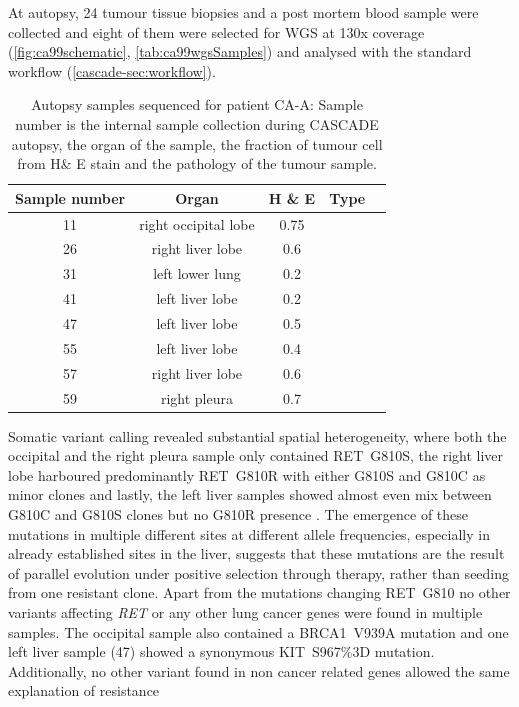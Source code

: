 At autopsy, 24 tumour tissue biopsies and a post mortem blood sample were collected and eight of them were selected for WGS at 130x coverage (\autoref{fig:ca99schematic}, \autoref{tab:ca99wgsSamples}) and analysed with the standard workflow (\autoref{cascade-sec:workflow}).

\begin{table}[ht]
\caption[Autopsy samples sequenced for patient CA-A]{Autopsy samples sequenced for patient CA-A: Sample number is the internal sample collection during CASCADE autopsy, the organ of the sample, the fraction of tumour cell from H\& E stain and the pathology of the tumour sample.}\label{tab:ca99wgsSamples}
\centering
{}
\begin{tabular}{|c|c|c|c|c|}
\toprule
\hline
 \rowcolor{gray!50}
\textbf{Sample number} & \textbf{Organ} & \textbf{H \& E} & \textbf{Type}\\
\hline
 11 & right occipital lobe & 0.75 &  \cellcolor{white}\\
 26 & right liver lobe & 0.6 & \cellcolor{white} \\
 31 & left lower lung & 0.2 & \cellcolor{white} \\
 41 & left liver lobe & 0.2 & \cellcolor{white} \\
 47 & left liver lobe & 0.5 & \cellcolor{white} \\
 55 & left liver lobe & 0.4 & \cellcolor{white} \\
 57 & right liver lobe & 0.6 & \cellcolor{white} \\
 59 & right pleura & 0.7 & \cellcolor{white}\multirow{-8}{*}{lung adenocarcinoma} \\
 \hline
\bottomrule
\end{tabular}
\end{table} 

Somatic variant calling revealed substantial spatial heterogeneity, where both the occipital and the right pleura sample only contained RET~G810S, the right liver lobe harboured predominantly RET~G810R with either G810S and G810C as minor clones and lastly, the left liver samples showed almost even mix between G810C and G810S clones but no G810R presence . The emergence of these mutations in multiple different sites at different allele frequencies, especially in already established sites in the liver, suggests that these mutations are the result of parallel evolution under positive selection through therapy, rather than seeding from one resistant clone.
Apart from the mutations changing RET~G810 no other variants affecting \textit{RET} or any other lung cancer genes were found in multiple samples. The occipital sample also contained a BRCA1~V939A  mutation and one left liver sample (47) showed a synonymous KIT~S967\%3D mutation. Additionally, no other variant found in non cancer related genes allowed the same explanation of resistance

